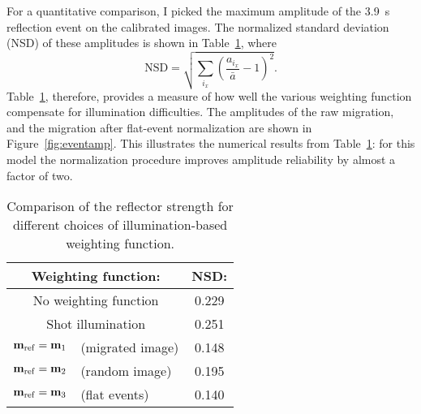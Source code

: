 \par
For a quantitative comparison, I picked the maximum amplitude of the 
3.9~s reflection event on the calibrated images.  
The normalized standard deviation (NSD) of these
amplitudes is shown in Table~\ref{table:normsd}, where 
\begin{equation}
\mbox{NSD} = 
\sqrt{ \sum_{i_x} \left( \frac{a_{i_x}}{\bar a} - 1 \right )^2}.
\end{equation}
Table~\ref{table:normsd}, therefore, provides a measure of how well
the various weighting function compensate for illumination
difficulties. 
The amplitudes of the raw migration, and the migration after
flat-event normalization are shown in Figure~\ref{fig:eventamp}.
This illustrates the numerical results from Table~\ref{table:normsd}:
for this model the normalization procedure improves amplitude
reliability by almost a factor of two.
\begin{table} 
\begin{center}
\begin{tabular}{||cl|c||} \hline
\multicolumn{2}{||c|}{Weighting function:}  & NSD:
\rule[-.3cm]{0cm}{.9cm} \\ \hline
\multicolumn{2}{||c|}{No weighting function} & 0.229 \rule[-.3cm]{0cm}{.9cm} \\
\multicolumn{2}{||c|}{Shot illumination} & 0.251\rule[-.3cm]{0cm}{.9cm}  \\
${\bf m}_{\rm ref}={\bf m}_1$ & (migrated image) & 0.148
\rule[-.3cm]{0cm}{.9cm} \\
${\bf m}_{\rm ref}={\bf m}_2$ & (random image) &
0.195\rule[-.3cm]{0cm}{.9cm}  \\
${\bf m}_{\rm ref}={\bf m}_3$ & (flat events) & 0.140
\rule[-.3cm]{0cm}{.9cm} \\
\hline
\end{tabular} \end{center}
\caption{Comparison of the reflector strength for different choices of
illumination-based weighting function.} \label{table:normsd}
\end{table}


